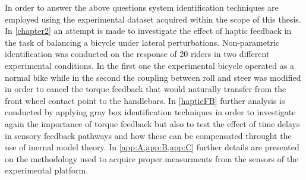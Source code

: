 In order to answer the above questions system identification techniques are employed using  the experimental dataset acquired within the scope of this thesis. In \cref{chapter2} an attempt is made to investigate the effect of haptic feedback in the task of balancing a bicycle under lateral perturbations. Non-parametric identification was conducted on the response of 20 riders in two different experimental conditions. In the first one the experimental bicycle operated as a normal bike while in the second the coupling between roll and steer was modified in order to cancel the torque feedback that would naturally transfer from the front wheel contact point to the handlebars. In \cref{hapticFB} further analysis is conducted by applying gray box identification techniques in order to investigate again the importance of torque feedback but also to test the effect of time delays in sensory feedback pathways and how these can be compensated throught the use of inernal model theory. In \cref{app:A,app:B,app:C} further details are presented on the methodology used to acquire proper measurments from the sensors of the experimental platform.


